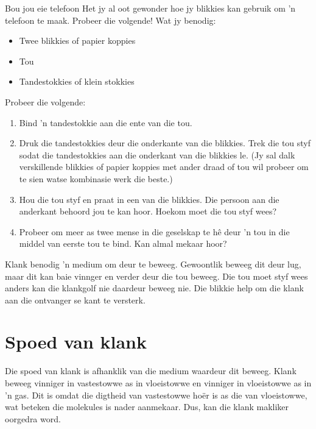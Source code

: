 	\par


\begin{activity}{Bou jou eie telefoon} 
Het jy al oot gewonder hoe jy blikkies kan gebruik om  'n telefoon te maak. Probeer die volgende!
Wat jy benodig:
\begin{itemize}
 \item Twee blikkies of papier koppies
  \item Tou
  \item Tandestokkies of klein stokkies
\end{itemize}

Probeer die volgende:
\begin{enumerate}[noitemsep, label=\textbf{\arabic*}. ] 
\item Bind  'n tandestokkie aan die ente van die tou. 
\item Druk die tandestokkies deur die onderkante van die blikkies. Trek die tou styf sodat die tandestokkies aan die onderkant van die blikkies le. (Jy sal dalk verskillende blikkies of papier koppies met ander draad of tou wil probeer om te sien watse kombinasie werk die beste.)
\item Hou die tou styf en praat in een van die blikkies. Die persoon aan die anderkant behoord jou te kan hoor. Hoekom moet die tou styf wees?
\item Probeer om meer as twee mense in die geselskap te h\^e deur  'n tou in die middel van eerste tou te bind. Kan almal mekaar hoor?
\end{enumerate}
Klank benodig  'n medium om deur te beweeg. Gewoontlik beweeg dit deur lug, maar dit kan baie vinnger en verder deur die tou beweeg. Die tou moet styf wees anders kan die klankgolf nie daardeur beweeg nie. Die blikkie help om die klank aan die ontvanger se kant te versterk.	
\end{activity}

    \label{m38799*cid3}
            \section{Spoed van klank}
            \nopagebreak
Die spoed van klank is afhanklik van die medium waardeur dit beweeg. Klank beweeg vinniger in vastestowwe as in vloeistowwe en vinniger in vloeistowwe as in  'n gas. Dit is omdat die digtheid van vastestowwe ho\"{e}r is as die van vloeistowwe, wat beteken die molekules is nader aanmekaar. Dus, kan die klank makliker oorgedra word.\par 

